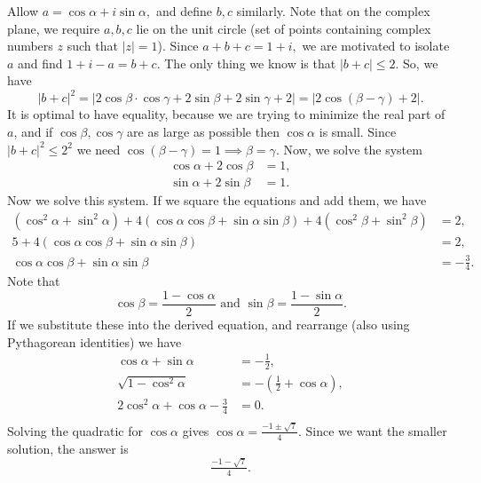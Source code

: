 \documentclass[11pt]{article}
\theoremstyle{definition}
\begin{document}
\begin{solution}[name={Solution by HrishiP}]
	Allow $a=\cos \alpha + i \sin \alpha,$ and define $b,c$ similarly. Note that on the complex plane, we require $a,b,c$ lie on the unit circle (set of points containing complex numbers $z$ such that $|z|=1$). Since $a+b+c = 1+i,$ we are motivated to isolate $a$ and find $1+i-a = b+c.$ The only thing we know is that $|b+c| \le 2.$ So, we have
	$$|b+c|^2 = |2\cos \beta \cdot \cos \gamma + 2 \sin \beta+ 2 \sin \gamma + 2| = |2\cos(\beta-\gamma)+2|.$$It is optimal to have equality, because we are trying to minimize the real part of $a$, and if $\cos \beta, \cos \gamma$ are as large as possible then $\cos \alpha$ is small. Since $|b+c|^2 \le 2^2$ we need $\cos(\beta-\gamma) = 1 \implies \beta = \gamma.$ Now, we solve the system
	\begin{align*}
		\cos \alpha + 2\cos \beta &= 1,\\ 
		\sin \alpha + 2\sin \beta &=1.
	\end{align*}
	Now we solve this system. If we square the equations and add them, we have
	\begin{align*}
		(\cos^2 \alpha + \sin^2 \alpha) + 4(\cos \alpha \cos \beta + \sin \alpha \sin \beta) + 4(\cos^2 \beta + \sin^2 \beta) &= 2,\\
		5+4(\cos \alpha \cos \beta + \sin \alpha \sin \beta)&= 2,\\
		\cos \alpha \cos \beta + \sin \alpha \sin \beta &= -\tfrac 34.
	\end{align*}Note that
	$$\cos \beta = \frac{1-\cos \alpha}{2} \text{  and  } \sin \beta = \frac{1-\sin \alpha}{2}.$$
	If we substitute these into the derived equation, and rearrange (also using Pythagorean identities) we have
	\begin{align*}
		\cos \alpha + \sin \alpha &= -\tfrac 12,\\
		\sqrt{1-\cos^2 \alpha} &= -\left(\tfrac 12 + \cos \alpha\right),\\
		2\cos^2 \alpha + \cos \alpha - \tfrac 34 &= 0.\\
	\end{align*}Solving the quadratic for $\cos \alpha$ gives $\cos \alpha = \tfrac{-1\pm \sqrt{7}}{4}.$ Since we want the smaller solution, the answer is $$\boxed{\tfrac{-1 -\sqrt{7}}{4}}.$$
\end{solution}
\end{document}
